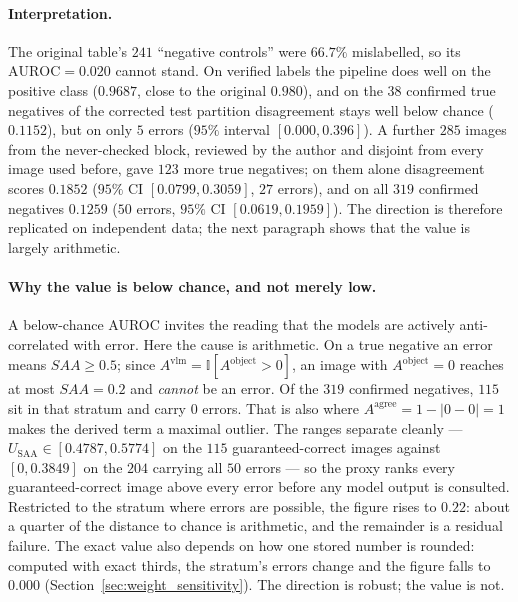 \documentclass[12pt,a4paper]{report}
\begin{document}
\paragraph{Interpretation.} The original table's $241$ ``negative controls'' were $66.7\%$ mislabelled, so its $\text{AUROC}=0.020$ cannot stand. On verified labels the pipeline does well on the positive class ($0.9687$, close to the original $0.980$), and on the $38$ confirmed true negatives of the corrected test partition disagreement stays well below chance ($0.1152$), but on only $5$ errors ($95\%$ interval $[0.000, 0.396]$). A further $285$ images from the never-checked block, reviewed by the author and disjoint from every image used before, gave $123$ more true negatives; on them alone disagreement scores $0.1852$ ($95\%$ CI $[0.0799, 0.3059]$, $27$ errors), and on all $319$ confirmed negatives $0.1259$ ($50$ errors, $95\%$ CI $[0.0619, 0.1959]$). The direction is therefore replicated on independent data; the next paragraph shows that the value is largely arithmetic.

\paragraph{Why the value is below chance, and not merely low.} A below-chance AUROC invites the reading that the models are actively anti-correlated with error. Here the cause is arithmetic. On a true negative an error means $SAA \ge 0.5$; since $A^{\text{vlm}} = \mathbb{I}[A^{\text{object}}>0]$, an image with $A^{\text{object}}=0$ reaches at most $SAA=0.2$ and \emph{cannot} be an error. Of the $319$ confirmed negatives, $115$ sit in that stratum and carry $0$ errors. That is also where $A^{\text{agree}} = 1-|0-0| = 1$ makes the derived term a maximal outlier. The ranges separate cleanly --- $U_{\text{SAA}} \in [0.4787, 0.5774]$ on the $115$ guaranteed-correct images against $[0, 0.3849]$ on the $204$ carrying all $50$ errors --- so the proxy ranks every guaranteed-correct image above every error before any model output is consulted. Restricted to the stratum where errors are possible, the figure rises to $0.22$: about a quarter of the distance to chance is arithmetic, and the remainder is a residual failure. The exact value also depends on how one stored number is rounded: computed with exact thirds, the stratum's errors change and the figure falls to $0.000$ (Section~\ref{sec:weight_sensitivity}). The direction is robust; the value is not.
\end{document}
